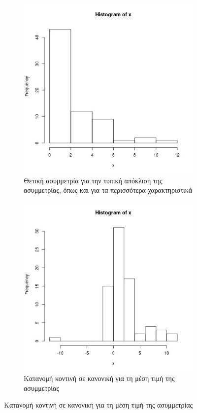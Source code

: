 \documentclass[]{article}
\numberwithin{equation}{section}		%
\numberwithin{figure}{section}			%
\numberwithin{table}{section}				%
\begin{document}
\begin{figure}[H]
    	\medskip
    	\begin{subfigure}{0.48\textwidth}
    		\includegraphics[width=\linewidth]{SkewnessSTD_scatter.jpg}
    		\caption{Θετική ασυμμετρία για την τυπική απόκλιση της ασυμμετρίας, όπως και για τα περισσότερα χαρακτηριστικά } \label{fig:c}
    	\end{subfigure}\hspace*{\fill}
    	\begin{subfigure}{0.48\textwidth}
    		\includegraphics[width=\linewidth]{SkewnessMean_scatter.jpg}
    		\caption{Κατανομή κοντινή σε κανονική για τη μέση τιμή της ασυμμετρίας} \label{fig:d}
    	\end{subfigure}
    	

\end{figure}
\end{document}
